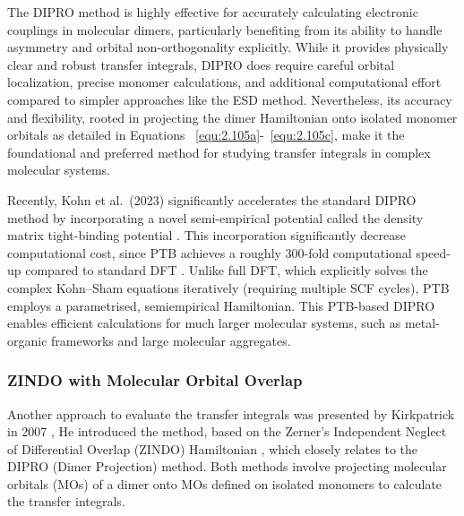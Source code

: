 The DIPRO method is highly effective for accurately calculating electronic couplings in molecular dimers, particularly benefiting from its ability to handle asymmetry and orbital non-orthogonality explicitly. While it provides physically clear and robust transfer integrals, DIPRO does require careful orbital localization, precise monomer calculations, and additional computational effort compared to simpler approaches like the ESD method. Nevertheless, its accuracy and flexibility, rooted in projecting the dimer Hamiltonian onto isolated monomer orbitals as detailed in Equations ~\eqref{equ:2.105a}-~\eqref{equ:2.105c}, make it the foundational and preferred method for studying transfer integrals in complex molecular systems.

Recently, Kohn et al.~(2023) significantly accelerates the standard DIPRO method by incorporating a novel semi-empirical potential called the density matrix tight-binding potential \cite{Kohn2023}. %
This incorporation significantly decrease computational cost, since PTB achieves a roughly 300-fold computational speed-up compared to standard DFT \cite{Grimme2023}. 
Unlike full DFT, which explicitly solves the complex Kohn–Sham equations iteratively (requiring multiple SCF cycles), PTB employs a parametrised, semiempirical Hamiltonian.
This PTB-based DIPRO enables efficient calculations for much larger molecular systems, such as metal-organic frameworks and large molecular aggregates.

\subsubsection{ZINDO with Molecular Orbital Overlap}
Another approach to evaluate the transfer integrals was presented by Kirkpatrick in 2007 \cite{Kirkpatrick2007}, 
He introduced the method, based on the Zerner’s Independent Neglect of Differential Overlap (ZINDO) Hamiltonian \cite{Ridley1973}, which closely relates to the DIPRO (Dimer Projection) method.
Both methods involve projecting molecular orbitals (MOs) of a dimer onto MOs defined on isolated monomers to calculate the transfer integrals.

